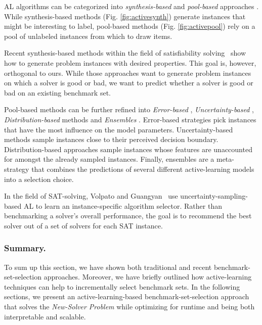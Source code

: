 \documentclass[runningheads]{llncs}
\begin{document}
AL algorithms can be categorized into \emph{synthesis-bas\-ed} \cite{0001AEMN22,GarzonMG22,2019gaal} and \emph{pool-bas\-ed} approaches \cite{GolbandiKL11,distribAL,HarpaleY08,KapoorGUD07,KorenBV09,KornerW06,MelvilleM04,SinhaED19,TongK01}.
While synthesis-based methods (Fig. \ref{fig:activesynth}) generate instances that might be interesting to label, pool-based methods (Fig. \ref{fig:activepool}) rely on a pool of unlabeled instances from which to draw items.

Recent synthesis-based methods within the field of satisfiability solving~\cite{0001AEMN22,GarzonMG22} show how to generate problem instances with desired properties.
This goal is, however, orthogonal to ours.
While those approaches want to generate problem instances on which a solver is good or bad, we want to predict whether a solver is good or bad on an existing benchmark set.

Pool-based methods can be further refined into \emph{Error-based} \cite{GolbandiKL11,KorenBV09}, \emph{Un\-cer\-tain\-ty-based} \cite{HarpaleY08,KapoorGUD07,TongK01}, \emph{Distribution-based} methods \cite{distribAL,SinhaED19} and \emph{Ensembles} \cite{KornerW06,MelvilleM04}.
Error-based strategies pick instances that have the most influence on the model parameters.
Uncertainty-based methods sample instances close to their perceived decision boundary.
Distribution-based approaches sample instances whose features are unaccounted for amongst the already sampled instances.
Finally, ensembles are a meta-strategy that combines the predictions of several different active-learning models into a selection choice.

In the field of SAT-solving, Volpato and Guangyan~\cite{volpato2019active} use uncertainty-sampling-based AL to learn an instance-specific algorithm selector.
Rather than benchmarking a solver's overall performance, the goal is to recommend the best solver out of a set of solvers for each SAT instance.

\subsubsection{Summary.}
To sum up this section, we have shown both traditional and recent benchmark-set-selection approaches.
Moreover, we have briefly outlined how active-learning techniques can help to incrementally select benchmark sets.
In the following sections, we present an active-learning-based benchmark-set-selection approach that solves the \emph{New-Solver Problem} while optimizing for runtime and being both interpretable and scalable.
\end{document}
